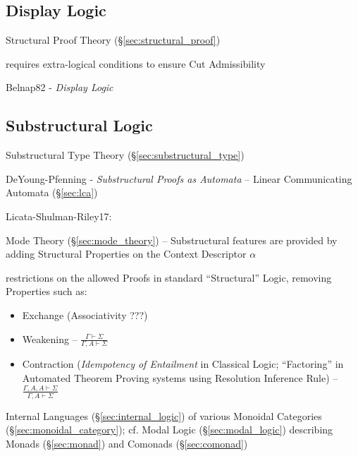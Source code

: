 \subsection{Display Logic}\label{sec:display_logic}

\fist Structural Proof Theory (\S\ref{sec:structural_proof})

requires extra-logical conditions to ensure Cut Admissibility

Belnap82 - \emph{Display Logic}



\subsection{Substructural Logic}\label{sec:substructural_logic}

Substructural Type Theory (\S\ref{sec:substructural_type})

DeYoung-Pfenning - \emph{Substructural Proofs as Automata}
-- Linear Communicating Automata (\S\ref{sec:lca})

Licata-Shulman-Riley17:

\fist Mode Theory (\S\ref{sec:mode_theory}) -- Substructural features
are provided by adding Structural Properties on the Context Descriptor
$\alpha$

restrictions on the allowed Proofs in standard ``Structural'' Logic,
removing Properties such as:
\begin{itemize}
  \item Exchange (Associativity ???) %
  \item Weakening -- $\frac{\Gamma \vdash \Sigma}
    {\Gamma,A \vdash \Sigma}$
  \item Contraction (\emph{Idempotency of Entailment} in Classical
    Logic; ``Factoring'' in Automated Theorem Proving systems using
    Resolution Inference Rule) -- $\frac{\Gamma,A,A \vdash \Sigma}
    {\Gamma,A \vdash \Sigma}$
\end{itemize}

Internal Languages (\S\ref{sec:internal_logic}) of various Monoidal
Categories (\S\ref{sec:monoidal_category}); cf. Modal Logic
(\S\ref{sec:modal_logic}) describing Monads (\S\ref{sec:monad}) and
Comonads (\S\ref{sec:comonad})



